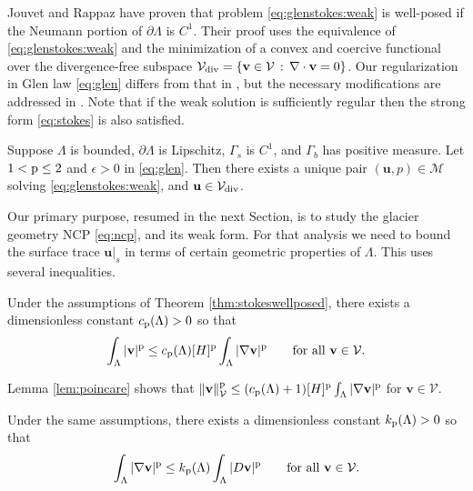 \documentclass[hidelinks,onefignum,onetabnum,final]{siamart220329}  %
\newcommand{\eps}{\epsilon}
\newcommand{\grad}{\nabla}
\newcommand{\Div}{\nabla\cdot}
\newcommand{\bu}{\mathbf{u}}
\newcommand{\bv}{\mathbf{v}}
\newcommand{\cV}{\mathcal{V}}
\newcommand{\pp}{{\text{\textnormal{p}}}}
\newcommand{\Vdiv}{\cV_{\text{\textnormal{div}}}}
\begin{document}
Jouvet and Rappaz \cite{JouvetRappaz2011} have proven that problem \eqref{eq:glenstokes:weak} is well-posed if the Neumann portion of $\partial\Lambda$ is $C^1$.  Their proof uses the equivalence of \eqref{eq:glenstokes:weak} and the minimization of a convex and coercive functional over the divergence-free subspace $\Vdiv = \{\bv\in\cV\,:\,\Div\bv=0\}$.  Our regularization in Glen law \eqref{eq:glen} differs from that in \cite{JouvetRappaz2011}, but the necessary modifications are addressed in \cite{IsaacStadlerGhattas2015}.  Note that if the weak solution is sufficiently regular then the strong form \eqref{eq:stokes} is also satisfied.

\begin{theorem} \label{thm:stokeswellposed}  Suppose $\Lambda$ is bounded, $\partial\Lambda$ is Lipschitz, $\Gamma_s$ is $C^1$, and $\Gamma_b$ has positive measure.  Let $1<\pp\le 2$ and $\eps>0$ in \eqref{eq:glen}.  Then there exists a unique pair $(\bu,p) \in \mathcal{M}$ solving \eqref{eq:glenstokes:weak}, and $\bu\in \Vdiv$.
\end{theorem}

Our primary purpose, resumed in the next Section, is to study the glacier geometry NCP \eqref{eq:ncp}, and its weak form.  For that analysis we need to bound the surface trace $\bu|_s$ in terms of certain geometric properties of $\Lambda$.  This uses several inequalities.

\begin{lemma} \label{lem:poincare}
Under the assumptions of Theorem \ref{thm:stokeswellposed}, there exists a dimensionless constant $c_{\pp}(\Lambda)>0$ so that
\begin{equation}
\int_\Lambda |\bv|^\pp \le c_{\pp}(\Lambda) [H]^\pp \int_\Lambda |\grad\bv|^\pp \qquad \text{for all } \bv \in \cV. \label{eq:poincare}
\end{equation}
\end{lemma}

Lemma \ref{lem:poincare} shows that $\|\bv\|_{\cV}^\pp \le (c_{\pp}(\Lambda) + 1) [H]^\pp \int_\Lambda |\grad\bv|^\pp$ for $\bv \in \cV$.
 
\begin{lemma} \label{lem:korns}
Under the same assumptions, there exists a dimensionless constant $k_{\pp}(\Lambda)>0$ so that
\begin{equation}
\int_\Lambda |\grad\bv|^\pp \le k_{\pp}(\Lambda) \int_\Lambda |D\bv|^\pp \qquad \text{for all } \bv \in \cV. \label{eq:korns}
\end{equation}
\end{lemma}
\end{document}

